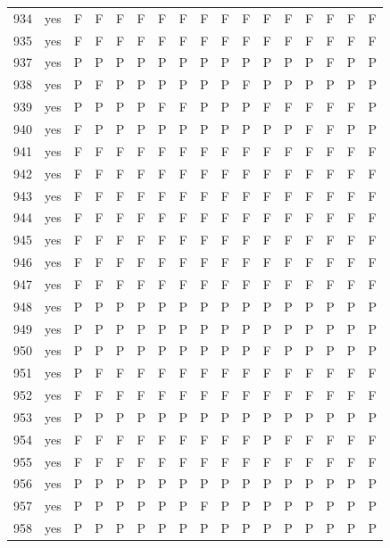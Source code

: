 \begin{table}[p]
\begin{tabular*}{\textwidth}{@{\extracolsep{\fill}}rcccccccccccccccc}
934 & yes & F & F & F & F & F & F & F & F & F & F & F & F & F & F & F\\
935 & yes & F & F & F & F & F & F & F & F & F & F & F & F & F & F & F\\
937 & yes & P & P & P & P & P & P & P & P & P & P & P & P & F & P & P\\
938 & yes & P & F & P & P & P & P & P & P & F & P & P & P & P & P & P\\
939 & yes & P & P & P & P & F & F & P & P & P & F & F & F & F & F & P\\
940 & yes & F & P & P & P & P & P & P & P & P & P & P & F & F & P & P\\
941 & yes & F & F & F & F & F & F & F & F & F & F & F & F & F & F & F\\
942 & yes & F & F & F & F & F & F & F & F & F & F & F & F & F & F & F\\
943 & yes & F & F & F & F & F & F & F & F & F & F & F & F & F & F & F\\
944 & yes & F & F & F & F & F & F & F & F & F & F & F & F & F & F & F\\
945 & yes & F & F & F & F & F & F & F & F & F & F & F & F & F & F & F\\
946 & yes & F & F & F & F & F & F & F & F & F & F & F & F & F & F & F\\
947 & yes & F & F & F & F & F & F & F & F & F & F & F & F & F & F & F\\
948 & yes & P & P & P & P & P & P & P & P & P & P & P & P & P & P & P\\
949 & yes & P & P & P & P & P & P & P & P & P & P & P & P & P & P & P\\
950 & yes & P & P & P & P & P & P & P & P & P & F & P & P & P & P & P\\
951 & yes & P & F & F & F & F & F & F & F & F & F & F & F & F & F & F\\
952 & yes & F & F & F & F & F & F & F & F & F & F & F & F & F & F & F\\
953 & yes & P & P & P & P & P & P & P & P & P & P & P & P & P & P & P\\
954 & yes & F & F & F & F & F & F & F & F & F & P & F & F & F & F & F\\
955 & yes & F & F & F & F & F & F & F & F & F & F & F & F & F & F & F\\
956 & yes & P & P & P & P & P & P & P & P & P & P & P & P & P & P & P\\
957 & yes & P & P & P & P & P & P & F & P & P & P & P & P & P & P & P\\
958 & yes & P & P & P & P & P & P & P & P & P & P & P & P & P & P & P\\
\bottomrule\end{tabular*}\end{table}
\clearpage

